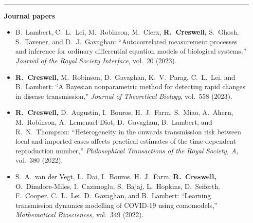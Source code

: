 \documentclass[11pt]{article}
\begin{document}
\vspace{0.6cm}




\vspace{-2.75mm} \\
\rule{\textwidth}{0.4pt}
\vspace*{.5cm}
\noindent\textbf{Journal papers}
\begin{itemize}[leftmargin=*]
\setlength{\itemsep}{4pt}
\setlength{\parskip}{0pt}
\setlength{\parsep}{0pt}
\vspace*{-.5cm}

\item {\color{gray}B.\ Lambert, C.\ L.\ Lei, M.\ Robinson, M.\ Clerx,} \textbf{R.\ Creswell,} {\color{gray} S.\ Ghosh, S.\ Tavener, and D.\ J.\ Gavaghan:} ``Autocorrelated measurement processes and inference for ordinary differential equation models of biological systems,'' \emph{Journal of the Royal Society Interface}, vol.\ 20 (2023).


\item \textbf{R.\ Creswell,} {\color{gray} M.\ Robinson, D.\ Gavaghan, K.\ V.\ Parag, C.\ L.\ Lei, and B.\ Lambert:} ``A Bayesian nonparametric method for detecting rapid changes in disease transmission,'' \emph{Journal of Theoretical Biology}, vol.\ 558 (2023).

\item \textbf{R.\ Creswell,\textsuperscript{\dag}} {\color{gray}D.\ Augustin,\textsuperscript{\dag} I.\ Bouros,\textsuperscript{\dag} H.\ J.\ Farm,\textsuperscript{\dag} S.\ Miao,\textsuperscript{\dag} A.\ Ahern,\textsuperscript{\dag} M.\ Robinson, A.\ Lemenuel-Diot, D.\ Gavaghan, B.\ Lambert, and R.\ N.\ Thompson:} ``Heterogeneity in the onwards transmission risk between local and imported cases affects practical estimates of the time-dependent reproduction number,'' \emph{Philosophical Transactions of the Royal Society, A,} vol.\ 380 (2022).

\item {\color{gray} S.\ A.\ van der Vegt,\textsuperscript{\dag} L.\ Dai,\textsuperscript{\dag} I.\ Bouros,\textsuperscript{\dag} H.\ J.\ Farm,\textsuperscript{\dag} \textbf{\color{black}R.\ Creswell,\textsuperscript{\dag}} O.\ Dimdore-Miles,\textsuperscript{\dag} I.\ Cazimoglu, S.\ Bajaj, L.\ Hopkins, D.\ Seiferth, F.\ Cooper, C.\ L.\ Lei, D.\ Gavaghan, and B.\ Lambert:} ``Learning transmission dynamics modelling of COVID-19 using comomodels,'' \emph{Mathematical Biosciences,} vol.\ 349 (2022).


\end{itemize}
\end{document}
